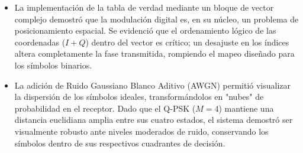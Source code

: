 \begin{itemize}
    \item La implementación de la tabla de verdad mediante un bloque de vector complejo demostró que la modulación digital es, en su núcleo, un problema de posicionamiento espacial. Se evidenció que el ordenamiento lógico de las coordenadas ($I+Q$) dentro del vector es crítico; un desajuste en los índices altera completamente la fase transmitida, rompiendo el mapeo diseñado para los símbolos binarios.

    \item La adición de Ruido Gaussiano Blanco Aditivo (AWGN) permitió visualizar la dispersión de los símbolos ideales, transformándolos en "nubes" de probabilidad en el receptor. Dado que el Q-PSK ($M=4$) mantiene una distancia euclidiana amplia entre sus cuatro estados, el sistema demostró ser visualmente robusto ante niveles moderados de ruido, conservando los símbolos dentro de sus respectivos cuadrantes de decisión.

\end{itemize}